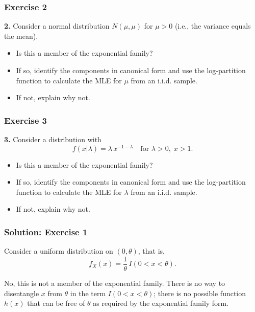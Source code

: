 \documentclass{beamer}
\begin{document}
\begin{frame}
\frametitle{Exercise 2}
\textbf{2.} Consider a normal distribution $N(\mu,\mu)$ for $\mu > 0$ (i.e., the variance equals the mean).
\begin{itemize}
  \item Is this a member of the exponential family?
  \item If so, identify the components in canonical form and use the log-partition function to calculate the MLE for $\mu$ from an i.i.d. sample.
  \item If not, explain why not.
\end{itemize}
\end{frame}

\begin{frame}
\frametitle{Exercise 3}
\textbf{3.} Consider a distribution with
\[
f(x|\lambda) = \lambda\, x^{-1-\lambda} \quad \text{for } \lambda>0,\; x>1.
\]
\begin{itemize}
  \item Is this a member of the exponential family?
  \item If so, identify the components in canonical form and use the log-partition function to calculate the MLE for $\lambda$ from an i.i.d. sample.
  \item If not, explain why not.
\end{itemize}
\end{frame}





\begin{frame}
\frametitle{Solution: Exercise 1}
Consider a uniform distribution on \((0, \theta)\), that is,
\[
f_X(x) = \frac{1}{\theta} \, I(0 < x < \theta).
\]

No, this is not a member of the exponential family. There is no way to disentangle \(x\) from \(\theta\) in the term \(I(0 < x < \theta)\); there is no possible function \(h(x)\) that can be free of \(\theta\) as required by the exponential family form.
\end{frame}
\end{document}
